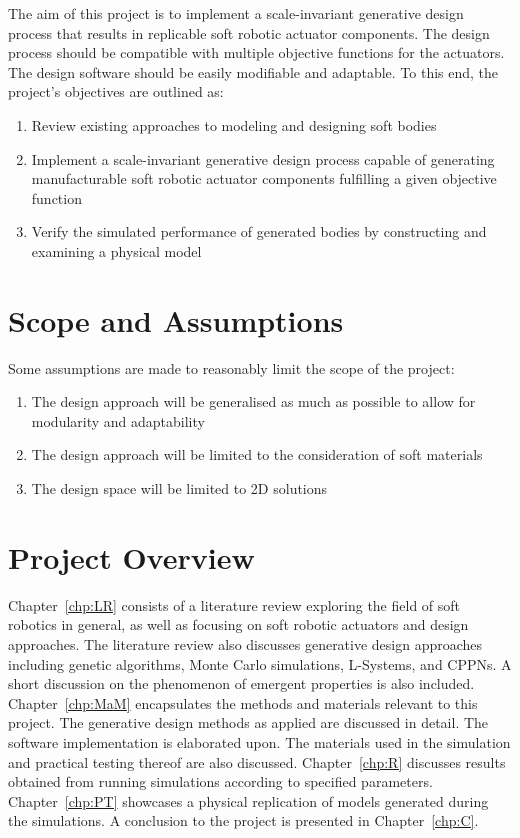 The aim of this project is to implement a scale-invariant generative design process that results in replicable soft robotic actuator components. The design process should be compatible with multiple objective functions for the actuators. The design software should be easily modifiable and adaptable. To this end, the project's objectives are outlined as:

\begin{enumerate}
	\item Review existing approaches to modeling and designing soft bodies
	\item Implement a scale-invariant generative design process capable of generating manufacturable soft robotic actuator components fulfilling a given objective function
	\item Verify the simulated performance of generated bodies by constructing and examining a physical model
\end{enumerate}

\section{Scope and Assumptions}

Some assumptions are made to reasonably limit the scope of the project:

\begin{enumerate}
	\item The design approach will be generalised as much as possible to allow for modularity and adaptability
	\item The design approach will be limited to the consideration of soft materials
	\item The design space will be limited to 2D solutions
\end{enumerate}

\section{Project Overview}

Chapter~\ref{chp:LR} consists of a literature review exploring the field of soft robotics in general, as well as focusing on soft robotic actuators and design approaches. The literature review also discusses generative design approaches including genetic algorithms, Monte Carlo simulations, L-Systems, and CPPNs. A short discussion on the phenomenon of emergent properties is also included. Chapter~\ref{chp:MaM} encapsulates the methods and materials relevant to this project. The generative design methods as applied are discussed in detail. The software implementation is elaborated upon. The materials used in the simulation and practical testing thereof are also discussed. Chapter~\ref{chp:R} discusses results obtained from running simulations according to specified parameters. Chapter~\ref{chp:PT} showcases a physical replication of models generated during the simulations. A conclusion to the project is presented in Chapter~\ref{chp:C}.